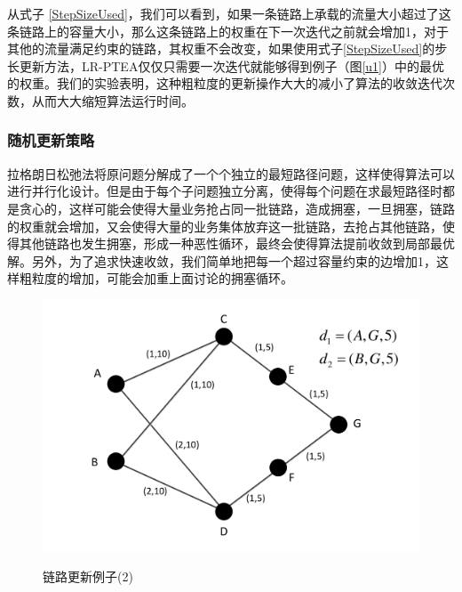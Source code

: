 从式子 \ref{StepSizeUsed}，我们可以看到，如果一条链路上承载的流量大小超过了这条链路上的容量大小，那么这条链路上的权重在下一次迭代之前就会增加1，对于其他的流量满足约束的链路，其权重不会改变，如果使用式子\ref{StepSizeUsed}的步长更新方法，LR-PTEA仅仅只需要一次迭代就能够得到例子（图\ref{u1}）中的最优的权重。我们的实验表明，这种粗粒度的更新操作大大的减小了算法的收敛迭代次数，从而大大缩短算法运行时间。
\subsubsection{随机更新策略}

拉格朗日松弛法将原问题分解成了一个个独立的最短路径问题，这样使得算法可以进行并行化设计。但是由于每个子问题独立分离，使得每个问题在求最短路径时都是贪心的，这样可能会使得大量业务抢占同一批链路，造成拥塞，一旦拥塞，链路的权重就会增加，又会使得大量的业务集体放弃这一批链路，去抢占其他链路，使得其他链路也发生拥塞，形成一种恶性循环，最终会使得算法提前收敛到局部最优解。另外，为了追求快速收敛，我们简单地把每一个超过容量约束的边增加1，这样粗粒度的增加，可能会加重上面讨论的拥塞循环。
\begin{figure}
\setlength{\abovecaptionskip}{-0.5cm}
\begin{center}
{\includegraphics[width=0.4 \textwidth]{figures/random.pdf}}
\end{center}
\caption{{\footnotesize{链路更新例子(2)}}}
\label{u2}
\end{figure}

